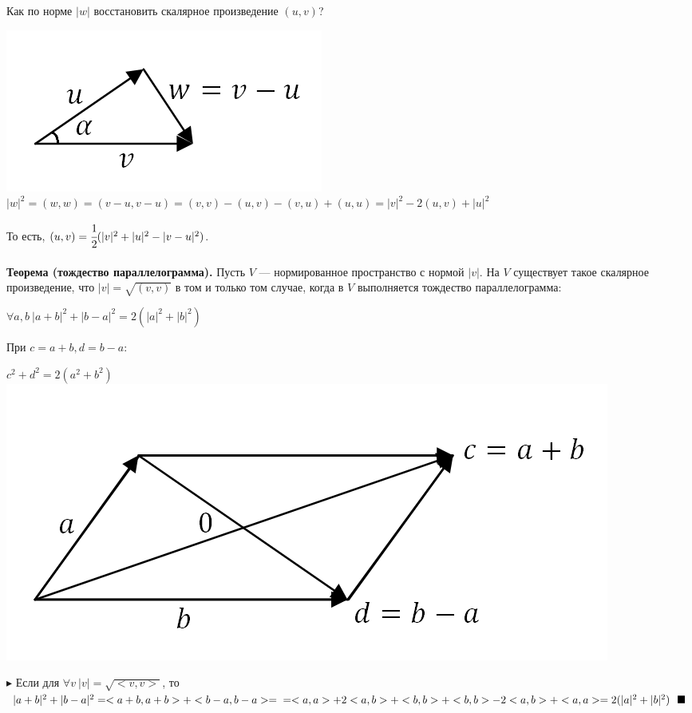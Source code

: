 \documentclass[12pt]{article}
\theoremstyle{definition}
\numberwithin{equation}{section}
\begin{document}
Как по норме $|w|$ восстановить скалярное произведение $(u, v)$?
\begin{center}\includegraphics[scale=0.55]{l5_10.png}\\
$|w|^2 = (w, w) = (v-u, v-u) = (v, v) - (u, v) - (v, u) + (u, u) = |v|^2 - 2(u, v) + |u|^2$\end{center}
То есть, $(u, v) = \cfrac{1}{2}(|v|^2 + |u|^2 - |v-u|^2)$.\\
\\
\textbf{Теорема (тождество параллелограмма).}
Пусть $V$ --- нормированное пространство с нормой $|v|$. На $V$ существует такое скалярное произведение, что $|v| = \sqrt{(v, v)}$ в том и только том случае, когда в $V$ выполняется тождество параллелограмма:\begin{center}
$\forall a, b~ |a+b|^2 + |b-a|^2 = 2(|a|^2 + |b|^2)$\end{center}
При $c = a+b, d = b-a:$ \begin{center}$c^2+d^2 = 2(a^2+b^2)$\\
\includegraphics[scale=0.55]{l5_11.png}\end{center}
$\blacktriangleright $ Если для $\forall v ~|v| = \sqrt{<v, v>}$, то $|a+b|^2+|b-a|^2 = <a+b, a+b> + <b-a, b-a> = \\=<a, a> + 2<a, b> + <b, b> +<b, b> - 2<a, b> + <a, a> = 2(|a|^2 + |b|^2)~~ \blacksquare$\\
\\
\end{document}

